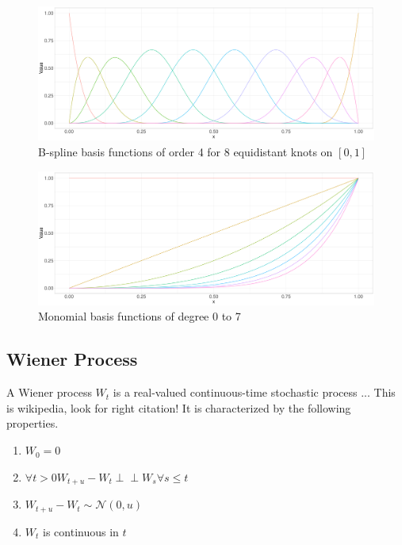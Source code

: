 \documentclass[11pt,twoside,a4paper]{article}
\begin{document}
	\begin{figure}[H]\label{bspline_basis}
		\includegraphics[width = \textwidth]{../Graphics/Bspline_Basis.pdf}
		\caption{B-spline basis functions of order 4 for 8 equidistant knots on $[0,1]$}
	\end{figure}

	\begin{figure}[H]\label{monomial_basis}
		\includegraphics[width = \textwidth]{../Graphics/Monomial_Basis.pdf}
		\caption{Monomial basis functions of degree 0 to 7}
	\end{figure}

\newpage




\subsection{Wiener Process}\label{Wiener}
A Wiener process $W_t$ is a real-valued continuous-time stochastic process {\color{red} ... This is wikipedia, look for right citation!}
It is characterized by the following properties.

\begin{multicols}{2}
	\begin{enumerate}
		\item $W_0 = 0$
		\item $\forall t > 0 W_{t+u} - W_t \perp\!\!\!\perp W_s \forall s \leq t$
		\item $W_{t+u} - W_t \sim \mathcal{N}(0,u)$
		\item $W_t$ is continuous in $t$
	\end{enumerate}
\end{multicols}
\end{document}
